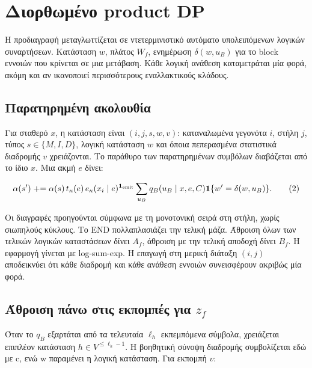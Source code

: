 \documentclass[
  10pt,
  a4paper,
]{report}
\begin{document}
\section{Διορθωμένο product
DP}\label{ux3b4ux3b9ux3bfux3c1ux3b8ux3c9ux3bcux3adux3bdux3bf-product-dp}

Η προδιαγραφή μεταγλωττίζεται σε ντετερμινιστικό αυτόματο υπολειπόμενων
λογικών συναρτήσεων. Κατάσταση \(w\), πλάτος \(W_f\), ενημέρωση
\(\delta(w,u_B)\) για το block εννοιών που κρίνεται σε μια μετάβαση.
Κάθε λογική ανάθεση καταμετράται μία φορά, ακόμη και αν ικανοποιεί
περισσότερους εναλλακτικούς κλάδους.

\subsection{Παρατηρημένη
ακολουθία}\label{ux3c0ux3b1ux3c1ux3b1ux3c4ux3b7ux3c1ux3b7ux3bcux3adux3bdux3b7-ux3b1ux3baux3bfux3bbux3bfux3c5ux3b8ux3afux3b1}

Για σταθερό \(x\), η κατάσταση είναι \((i,j,s,w,v)\): καταναλωμένα
γεγονότα \(i\), στήλη \(j\), τύπος \(s\in\{M,I,D\}\), λογική κατάσταση
\(w\) και όποια πεπερασμένα στατιστικά διαδρομής \(v\) χρειάζονται. Το
παράθυρο των παρατηρημένων συμβόλων διαβάζεται από το ίδιο \(x\). Μια
ακμή \(e\) δίνει:

\[
\alpha(s')\mathrel{+}=\alpha(s)\,t_\kappa(e)\,e_\kappa(x_i\mid e)^{\mathbf1_{\rm emit}}
\sum_{u_B}q_B(u_B\mid x,e,C)\mathbf1\{w'=\delta(w,u_B)\}.\tag{2}
\]

Οι διαγραφές προηγούνται σύμφωνα με τη μονοτονική σειρά στη στήλη, χωρίς
σιωπηλούς κύκλους. Το END πολλαπλασιάζει την τελική μάζα. Άθροιση όλων
των τελικών λογικών καταστάσεων δίνει \(A_f\), άθροιση με την τελική
αποδοχή δίνει \(B_f\). Η εφαρμογή γίνεται με log-sum-exp. Η επαγωγή στη
μερική διάταξη \((i,j)\) αποδεικνύει ότι κάθε διαδρομή και κάθε ανάθεση
εννοιών συνεισφέρουν ακριβώς μία φορά.

\subsection{\texorpdfstring{Άθροιση πάνω στις εκπομπές για
\(z_f\)}{Άθροιση πάνω στις εκπομπές για z\_f}}\label{ux3acux3b8ux3c1ux3bfux3b9ux3c3ux3b7-ux3c0ux3acux3bdux3c9-ux3c3ux3c4ux3b9ux3c2-ux3b5ux3baux3c0ux3bfux3bcux3c0ux3adux3c2-ux3b3ux3b9ux3b1-z_f}

Όταν το \(q_B\) εξαρτάται από τα τελευταία \(\ell_h\) εκπεμπόμενα
σύμβολα, χρειάζεται επιπλέον κατάσταση \(h\in V^{\le \ell_h-1}\). Η
βοηθητική σύνοψη διαδρομής συμβολίζεται εδώ με c, ενώ w παραμένει η
λογική κατάσταση. Για εκπομπή \(v\):
\end{document}
